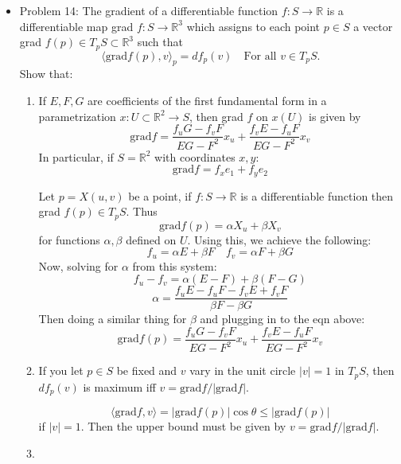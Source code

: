 \documentclass[a4paper,17pt]{extarticle}
\theoremstyle{definition}
\renewcommand{\skip}{\par\null\par}
\newcommand{\R}{\mathbb{R}}
\begin{document}
\begin{itemize}
\begin{proof}
\begin{align*}
    \end{align*}
    Again I got lost, I am not understanding this section
    \end{proof}
    \item Problem 14: The gradient of a differentiable function $f:S\to\R$ is a differentiable map grad $f:S\to\R^3$ which assigns to each point $p\in S$ a vector grad $f(p)\in T_pS\subset\R^3$ such that $$\langle\text{grad}f(p),v\rangle_p=df_p(v)\quad\text{For all }v\in T_pS.$$ Show that:\begin{enumerate}[label=\alph*.]
        \item If $E,F,G$ are coefficients of the first fundamental form in a parametrization $x:U\subset\R^2\to S$, then grad $f$ on $x(U)$ is given by $$\text{grad} f=\frac{f_uG-f_vF}{EG-F^2}x_u+\frac{f_vE-f_uF}{EG-F^2}x_v$$ In particular, if $S=\R^2$ with coordinates $x,y$: $$\text{grad} f=f_xe_1+f_ye_2$$\skip Let $p=X(u,v)$ be a point, if $f:S\to\R$ is a differentiable function then grad $f(p)\in T_pS$. Thus $$\text{grad}f(p)=\alpha X_u+\beta X_v$$ for functions $\alpha,\beta$ defined on $U$. Using this, we achieve the following: $$f_u=\alpha E+\beta F\quad f_v=\alpha F+\beta G$$ Now, solving for $\alpha$ from this system: $$f_u-f_v=\alpha(E-F)+\beta(F-G)$$ $$\alpha=\frac{f_uE-f_uF-f_vE+f_vF}{\beta F-\beta G}$$
        Then doing a similar thing for $\beta$ and
        plugging in to the eqn above: $$\text{grad}f(p)=\frac{f_uG-f_vF}{EG-F^2}x_u+\frac{f_vE-f_uF}{EG-F^2}x_v$$
        \item If you let $p\in S$ be fixed and $v$ vary in the unit circle $|v|=1$ in $T_pS$, then $df_p(v)$ is maximum iff $v=\text{grad}f/|\text{grad}f|$.\skip $$\langle\text{grad}f,v\rangle=|\text{grad}f(p)|\cos\theta\leq|\text{grad}f(p)|$$ if $|v|=1$. Then the upper bound must be given by $v=\text{grad}f/|\text{grad}f|$.
        \item 
    \end{enumerate}
\end{itemize}
\end{document}
